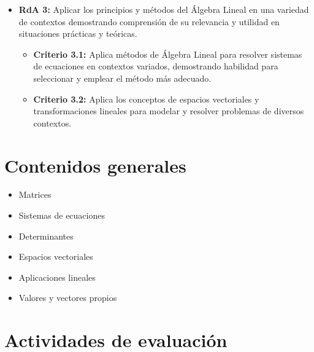 \documentclass[a4,11pt]{aleph-notas}
\begin{document}
\begin{itemize}[leftmargin=*]
\begin{itemize}[leftmargin=*]
    \end{itemize}
\item
    \textbf{RdA 3:} Aplicar los principios y métodos del Álgebra Lineal en una variedad de contextos demostrando comprensión de su relevancia y utilidad en situaciones prácticas y teóricas.
    \begin{itemize}[leftmargin=*]
        \item \textbf{Criterio 3.1:} Aplica métodos de Álgebra Lineal para resolver sistemas de ecuaciones en contextos variados, demostrando habilidad para seleccionar y emplear el método más adecuado.
        \item \textbf{Criterio 3.2:} Aplica los conceptos de espacios vectoriales y transformaciones lineales para modelar y resolver problemas de diversos contextos.
    \end{itemize}
\end{itemize}

\section{Contenidos generales} 

\begin{itemize}
\item 
    Matrices
\item 
    Sistemas de ecuaciones
\item 
    Determinantes
\item 
    Espacios vectoriales
\item 
    Aplicaciones lineales
\item 
    Valores y vectores propios
\end{itemize}

\section{Actividades de evaluación} 
\end{document}
